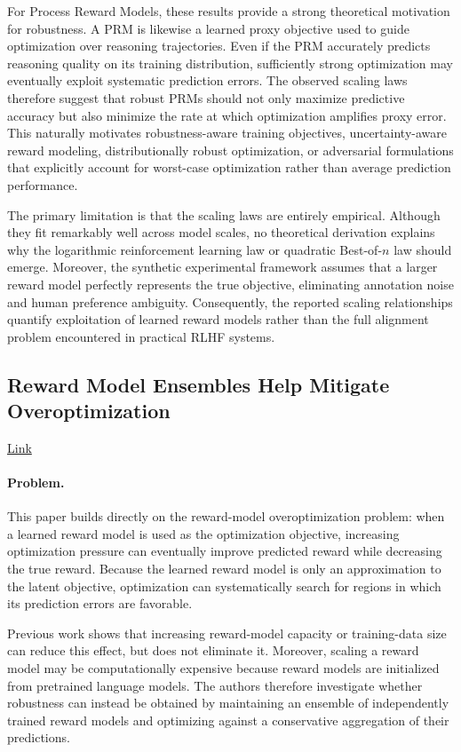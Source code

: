 \documentclass[11pt]{article}
\begin{document}
For Process Reward Models, these results provide a strong theoretical motivation for robustness. A PRM is likewise a learned proxy objective used to guide optimization over reasoning trajectories. Even if the PRM accurately predicts reasoning quality on its training distribution, sufficiently strong optimization may eventually exploit systematic prediction errors. The observed scaling laws therefore suggest that robust PRMs should not only maximize predictive accuracy but also minimize the rate at which optimization amplifies proxy error. This naturally motivates robustness-aware training objectives, uncertainty-aware reward modeling, distributionally robust optimization, or adversarial formulations that explicitly account for worst-case optimization rather than average prediction performance.

The primary limitation is that the scaling laws are entirely empirical. Although they fit remarkably well across model scales, no theoretical derivation explains why the logarithmic reinforcement learning law or quadratic Best-of-$n$ law should emerge. Moreover, the synthetic experimental framework assumes that a larger reward model perfectly represents the true objective, eliminating annotation noise and human preference ambiguity. Consequently, the reported scaling relationships quantify exploitation of learned reward models rather than the full alignment problem encountered in practical RLHF systems.

\subsection{Reward Model Ensembles Help Mitigate Overoptimization}

\href{https://arxiv.org/pdf/2310.02743}{Link}

\paragraph{Problem.}

This paper builds directly on the reward-model overoptimization problem: when a learned reward model is used as the optimization objective, increasing optimization pressure can eventually improve predicted reward while decreasing the true reward. Because the learned reward model is only an approximation to the latent objective, optimization can systematically search for regions in which its prediction errors are favorable.

Previous work shows that increasing reward-model capacity or training-data size can reduce this effect, but does not eliminate it. Moreover, scaling a reward model may be computationally expensive because reward models are initialized from pretrained language models. The authors therefore investigate whether robustness can instead be obtained by maintaining an ensemble of independently trained reward models and optimizing against a conservative aggregation of their predictions.
\end{document}
